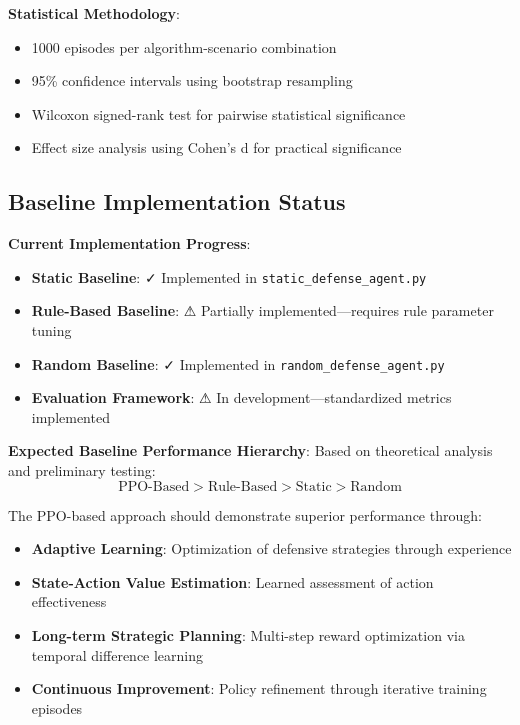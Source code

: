 \documentclass[12pt]{article}
\theoremstyle{definition}
\theoremstyle{plain}
\begin{document}
\textbf{Statistical Methodology}:
\begin{itemize}
    \item 1000 episodes per algorithm-scenario combination
    \item 95\% confidence intervals using bootstrap resampling
    \item Wilcoxon signed-rank test for pairwise statistical significance
    \item Effect size analysis using Cohen's d for practical significance
\end{itemize}

\subsection{Baseline Implementation Status}

\textbf{Current Implementation Progress}:
\begin{itemize}
    \item \textbf{Static Baseline}: ✓ Implemented in \texttt{static\_defense\_agent.py}
    \item \textbf{Rule-Based Baseline}: ⚠ Partially implemented—requires rule parameter tuning
    \item \textbf{Random Baseline}: ✓ Implemented in \texttt{random\_defense\_agent.py}
    \item \textbf{Evaluation Framework}: ⚠ In development—standardized metrics implemented
\end{itemize}

\textbf{Expected Baseline Performance Hierarchy}:
Based on theoretical analysis and preliminary testing:
\begin{equation}
\text{PPO-Based} > \text{Rule-Based} > \text{Static} > \text{Random}
\end{equation}

The PPO-based approach should demonstrate superior performance through:
\begin{itemize}
    \item \textbf{Adaptive Learning}: Optimization of defensive strategies through experience
    \item \textbf{State-Action Value Estimation}: Learned assessment of action effectiveness
    \item \textbf{Long-term Strategic Planning}: Multi-step reward optimization via temporal difference learning
    \item \textbf{Continuous Improvement}: Policy refinement through iterative training episodes
\end{itemize}
\end{document}
